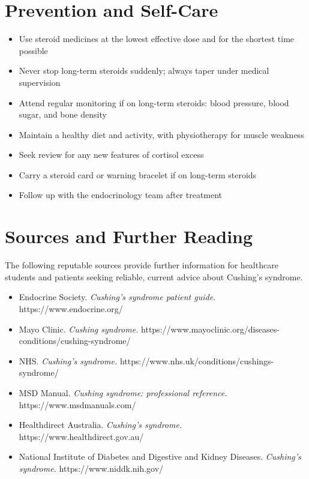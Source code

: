\section*{Prevention and Self-Care}
\begin{itemize}
    \item Use steroid medicines at the lowest effective dose and for the shortest time possible
    \item Never stop long-term steroids suddenly; always taper under medical supervision
    \item Attend regular monitoring if on long-term steroids: blood pressure, blood sugar, and bone density
    \item Maintain a healthy diet and activity, with physiotherapy for muscle weakness
    \item Seek review for any new features of cortisol excess
    \item Carry a steroid card or warning bracelet if on long-term steroids
    \item Follow up with the endocrinology team after treatment
\end{itemize}

\section*{Sources and Further Reading}
The following reputable sources provide further information for healthcare students and patients seeking reliable, current advice about Cushing's syndrome.

\begin{itemize}
    \item Endocrine Society. \textit{Cushing's syndrome patient guide.} https://www.endocrine.org/
    \item Mayo Clinic. \textit{Cushing syndrome.} https://www.mayoclinic.org/diseases-conditions/cushing-syndrome/
    \item NHS. \textit{Cushing's syndrome.} https://www.nhs.uk/conditions/cushings-syndrome/
    \item MSD Manual. \textit{Cushing syndrome: professional reference.} https://www.msdmanuals.com/
    \item Healthdirect Australia. \textit{Cushing's syndrome.} https://www.healthdirect.gov.au/
    \item National Institute of Diabetes and Digestive and Kidney Diseases. \textit{Cushing's syndrome.} https://www.niddk.nih.gov/
\end{itemize}
